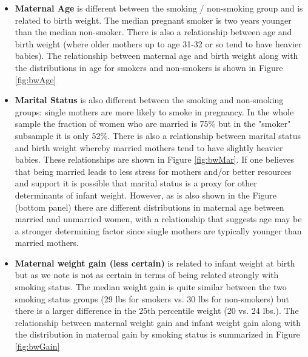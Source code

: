 \documentclass[a4paper, 12pt]{article}
\begin{document}
\begin{itemize}

\item \textbf{Maternal Age} is different between the smoking / non-smoking group and is related to birth weight.  The median pregnant smoker is two years younger than the median non-smoker.  There is also a relationship between age and birth weight (where older mothers up to age 31-32 or so tend to have heavier babies).  The relationship between maternal age and birth weight along with the distributions in age for smokers and non-smokers is shown in Figure \ref{fig:bwAge}

\item \textbf{Marital Status} is also different between the smoking and non-smoking groups: single mothers are more likely to smoke in pregnancy.  In the whole sample the fraction of women who are married is 75\% but in the "smoker" subsample it is only 52\%.  There is also a relationship between marital status and birth weight whereby married mothers tend to have slightly heavier babies.  These relationships are shown in Figure \ref{fig:bwMar}.  If one believes that being married leads to less stress for mothers and/or better resources and support it is possible that marital status is a proxy for other determinants of infant weight.  However, as is also shown in the Figure (bottom panel) there are different distributions in maternal age between married and unmarried women, with a relationship that suggests age may be a stronger determining factor since single mothers are typically younger than married mothers.   

\item \textbf{Maternal weight gain (less certain)} is related to infant weight at birth but as we note is not as certain in terms of being related strongly with smoking status.  The median weight gain is quite similar between the two smoking status groups (29 lbs for smokers vs. 30 lbs for non-smokers) but there is a larger difference in the 25th percentile weight (20 vs. 24 lbs.).  The relationship between maternal weight gain and infant weight gain along with the distribution in maternal gain by smoking status is summarized in Figure \ref{fig:bwGain}


\end{itemize}
\end{document}
